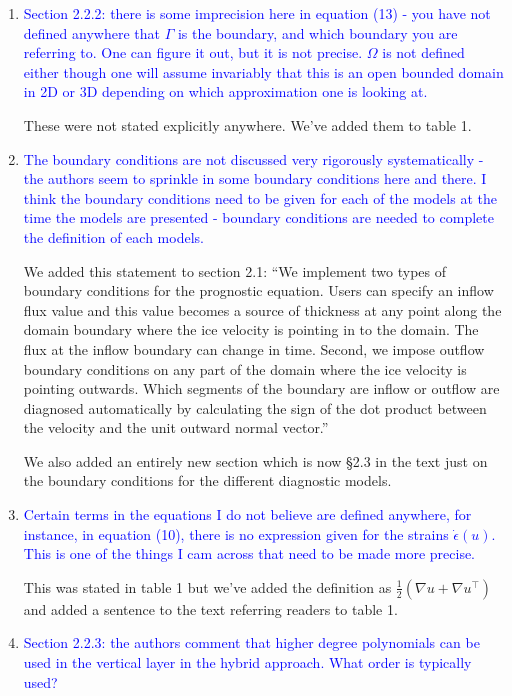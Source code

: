 \documentclass{article}
\theoremstyle{definition}
\theoremstyle{plain}
\begin{document}
\begin{enumerate}
\item \textcolor{blue}{Section 2.2.2: there is some imprecision here in equation (13) - you have not defined anywhere that $\Gamma$
is the boundary, and which boundary you are referring to. One can figure it out, but it is not precise.
$\Omega$ is not defined either though one will assume invariably that this is an open bounded domain in 2D
or 3D depending on which approximation one is looking at.}

These were not stated explicitly anywhere.
We've added them to table 1.
\item \textcolor{blue}{The boundary conditions are not discussed very rigorously systematically - the authors seem to
sprinkle in some boundary conditions here and there. I think the boundary conditions need to be
given for each of the models at the time the models are presented - boundary conditions are needed
to complete the definition of each models.}

We added this statement to section 2.1: ``We implement two types of boundary conditions for the prognostic equation.
Users can specify an inflow flux value and this value becomes a source of thickness at any point along the domain boundary where the ice velocity is pointing in to the domain.
The flux at the inflow boundary can change in time.
Second, we impose outflow boundary conditions on any part of the domain where the ice velocity is pointing outwards.
Which segments of the boundary are inflow or outflow are diagnosed automatically by calculating the sign of the dot product between the velocity and the unit outward normal vector.''

We also added an entirely new section which is now \S2.3 in the text just on the boundary conditions for the different diagnostic models.

\item \textcolor{blue}{Certain terms in the equations I do not believe are defined anywhere, for instance, in equation (10),
there is no expression given for the strains $\dot\epsilon(u)$.
This is one of the things I cam across that need to
be made more precise.}

This was stated in table 1 but we've added the definition as $\frac{1}{2}(\nabla u + \nabla u^\top)$ and added a sentence to the text referring readers to table 1.
\item \textcolor{blue}{Section 2.2.3: the authors comment that higher degree polynomials can be used in the vertical layer
in the hybrid approach. What order is typically used?}


\end{enumerate}
\end{document}
